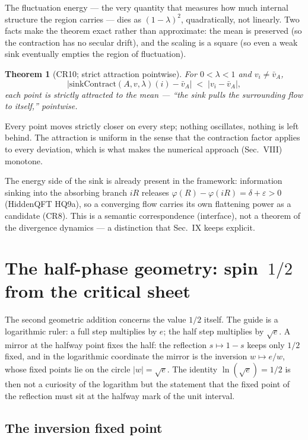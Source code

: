 \documentclass[aps,prd,preprint,superscriptaddress,amsmath,amssymb]{revtex4-2}
\newtheorem{theorem}{Theorem}[section]
\begin{document}
The fluctuation energy --- the very quantity that measures how much
internal structure the region carries --- dies as $(1-\lambda)^2$,
quadratically, not linearly.  Two facts make the theorem exact rather
than approximate: the mean is preserved (so the contraction has no
secular drift), and the scaling is a square (so even a weak sink
eventually empties the region of fluctuation).

\begin{theorem}[CR10; strict attraction pointwise]
\label{thm:cr10}
For $0<\lambda<1$ and $v_i\neq\bar v_A$,
\[
\bigl|\text{sinkContract}(A,v,\lambda)(i)-\bar v_A\bigr|
\;<\;\bigl|v_i-\bar v_A\bigr| ,
\]
each point is strictly attracted to the mean --- ``the sink pulls the
surrounding flow to itself,'' pointwise.
\end{theorem}

Every point moves strictly closer on every step; nothing oscillates,
nothing is left behind.  The attraction is uniform in the sense that
the contraction factor applies to every deviation, which is what makes
the numerical approach (Sec.~VIII) monotone.

The energy side of the sink is already present in the framework:
information sinking into the absorbing branch $iR$ releases
$\varphi(R)-\varphi(iR)=\delta+\varepsilon>0$ (HiddenQFT HQ9a), so a
converging flow carries its own flattening power as a candidate
(CR8).  This is a semantic correspondence (interface), not a theorem
of the divergence dynamics --- a distinction that Sec.~IX keeps
explicit.

\section{The half-phase geometry: spin~$1/2$ from the critical sheet}
\label{sec:halfphase}

The second geometric addition concerns the value $1/2$ itself.  The
guide is a logarithmic ruler: a full step multiplies by $e$; the half
step multiplies by $\sqrt e$.  A mirror at the halfway point fixes the
half: the reflection $s\mapsto 1-s$ keeps only $1/2$ fixed, and in the
logarithmic coordinate the mirror is the inversion $w\mapsto e/w$,
whose fixed points lie on the circle $|w|=\sqrt e$.  The identity
$\ln(\sqrt e)=1/2$ is then not a curiosity of the logarithm but the
statement that the fixed point of the reflection must sit at the
halfway mark of the unit interval.

\subsection{The inversion fixed point}
\end{document}
